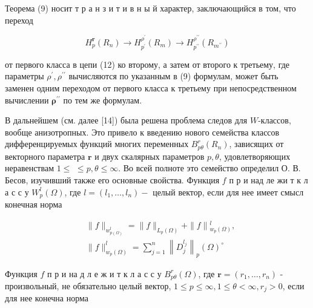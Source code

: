\documentclass[10pt]{article}
\begin{document}
Теорема (9) носит т р а н з и т и в н ы й характер, заключающийся в том, что переход



\[

H_{p}^{\boldsymbol{r}}\left(R_{n}\right) \longrightarrow H_{p^{\prime}}^{\rho^{\prime}}\left(R_{m}\right) \longrightarrow H_{p^{\prime \prime}}^{\rho^{\prime \prime}}\left(R_{m^{\prime \prime}}\right)

\]



от первого класса в цепи (12) ко второму, а затем от второго к третьему, где параметры $\rho^{\prime}, \rho^{\prime \prime}$ вычисляются по указанным в (9) формулам, может быть заменен одним переходом от первого класса к третьему при непосредственном вычислении $\boldsymbol{\rho}^{\prime \prime}$ по тем же формулам.



В дальнейшем (см. далее [14]) была решена проблема следов для $W$-классов, вообще анизотропных. Это привело к введению нового семейства классов дифференцируемых функций многих переменных $B_{p \theta}^{r}\left(R_{n}\right)$, зависящих от векторного параметра $\boldsymbol{r}$ и двух скалярных параметров $p, \theta$, удовлетворяющих неравенствам $1 \leqslant$ $\leqslant p, \theta \leqslant \infty$. Во всей полноте это семейство определил О. В. Бесов, изучивший также его основные свойства. Функция $f$ п р и над ле жи т к л а с с у $W_{p}^{l}(\Omega)$, где $l=\left(l_{1}, \ldots, l_{n}\right)-$ целый вектор, если для нее имеет смысл конечная норма



\[

\begin{aligned}

& \|f\|_{w_{p(\Omega)}^{l}}=\|f\|_{L_{p}(\Omega)}+\|f\|{ }_{w_{p}(\Omega)}^{l}, \\

& \|f\|_{w_{p}(\Omega)}^{l}=\sum_{j=1}^{n}\left\|D_{j}^{l_{j}}\right\|_{p}(\Omega)^{\circ}

\end{aligned}

\]



Функция $f$ п р и на д л е ж и т к л а с с у $B_{p \theta}^{r}(\Omega)$, где $\boldsymbol{r}=\left(r_{1}, \ldots, r_{n}\right)$ - произвольный, не обязательно целый вектор, $1 \leqslant p \leqslant \infty, 1 \leqslant \theta<\infty, r_{j}>0$, если для нее конечна норма
\end{document}
